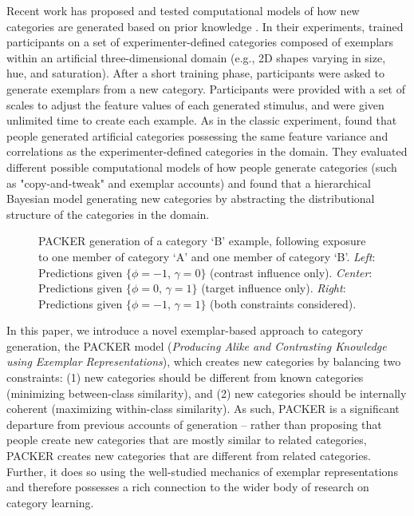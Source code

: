 \documentclass[10pt,letterpaper]{article}
\newcommand\inputpgf[2]{{
\let\pgfimageWithoutPath\pgfimage
\renewcommand{\pgfimage}[2][]{\pgfimageWithoutPath[##1]{#1/##2}}

}}
\begin{document}
Recent work has proposed and tested computational models of how new categories are generated based on prior knowledge \citep{jern2013probabilistic}. In their experiments, \citet{jern2013probabilistic} trained participants on a set of experimenter-defined categories composed of exemplars within an artificial three-dimensional domain (e.g., 2D shapes varying in size, hue, and saturation). After a short training phase, participants were asked to generate exemplars from a new category. Participants were provided with a set of scales to adjust the feature values of each generated stimulus, and were given unlimited time to create each example. As in the classic \cite{ward1994structured} experiment, \citet{jern2013probabilistic} found that people generated artificial categories possessing the same feature variance and correlations as the experimenter-defined categories in the domain. They evaluated different possible computational models of how people generate categories (such as "copy-and-tweak" and exemplar accounts) and found that a hierarchical Bayesian model generating new categories by abstracting the distributional structure of the categories in the domain.

\begin{figure*}
    \begin{center}
    \inputpgf{figs/}{example-prob-spaces.pgf}
    \caption{PACKER generation of a category `B' example, following exposure to one member of category `A' and one member of category `B'. \textit{Left}: Predictions given $\{\phi = -1$, $\gamma = 0\}$ (contrast influence only). \textit{Center}: Predictions given $\{\phi = 0$, $\gamma = 1\}$ (target influence only).  \textit{Right}: Predictions given $\{\phi = -1$, $\gamma = 1\}$ (both constraints considered).  }
    \label{fig:example-prob-spaces}
    \end{center}
\end{figure*}

In this paper, we introduce a novel exemplar-based approach to category generation, the PACKER model (\textit{Producing Alike and Contrasting Knowledge using Exemplar Representations}), which creates new categories by balancing two constraints: (1) new categories should be different from known categories (minimizing between-class similarity), and (2) new categories should be internally coherent (maximizing within-class similarity). As such, PACKER is a significant departure from previous accounts of generation -- rather than proposing that people create new categories that are mostly similar to related categories, PACKER creates new categories that are different from related categories. Further, it does so using the well-studied mechanics of exemplar representations and therefore possesses a rich connection to the wider body of research on category learning.
\end{document}

